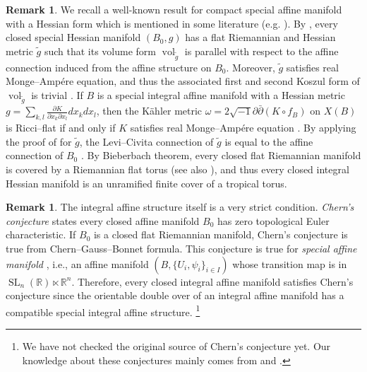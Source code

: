 \documentclass[a4paper,dvipdfmx,reqno,12pt]{amsart}
\makeatletter
\newcommand{\ind}[2]{\emph{#1}\index{1{#2}@{#1}}}
\theoremstyle{definition}
\newtheorem{remark}[theorem]{Remark}
\newcommand{\opn}[1]{\operatorname{#1}}
\newcommand{\myfootnote}[1]{\hspace{-5pt}\footnote{#1}}
\numberwithin{equation}{section}
\makeatother
\begin{document}
\begin{remark} \label{remark-compact-hessian}
We recall a well-known result for 
compact special affine manifold with 
a Hessian form which is mentioned 
in some literature
(e.g. \cite[]{MR1882331}).
By \cite[Theorem 2.1 and Corollary 2.3]{MR714338},
 every closed special Hessian manifold $(B_0,g)$ has 
a flat Riemannian and Hessian metric $\tilde{g}$ such 
that its volume form $\opn{vol}_{\tilde{g}}$ is parallel 
with respect to the
affine connection induced from the affine structure 
on $B_0$. Moreover, $\tilde{g}$ satisfies 
real Monge--Amp\'ere equation, and thus
the associated first and second Koszul 
form of $\opn{vol}_{\tilde{g}}$ is trivial 
\cite[Definition 3.1.2]{MR2293045}.
If $B$ is a special integral affine manifold with 
a Hessian metric 
$g=\sum_{k,l}\frac{\partial K}{\partial x_k \partial x_l}dx_k dx_l$, 
then the K\"ahler metric $\omega=2\sqrt{-1}\partial \bar{\partial}
(K\circ f_{B})$ on $X(B)$ is Ricci--flat if 
and only if $K$ satisfies real Monge--Amp\'ere equation
\cite[Proposition 6.14]{MR2567952}. 
By applying the proof of \cite[Theorem 8.3.3]{MR2293045}
for $\tilde{g}$,
the Levi--Civita connection of $\tilde{g}$ is 
equal to the affine connection of $B_0$ 
\cite[Corollary 8.3.7]{MR2293045}. 
By Bieberbach theorem, every closed flat Riemannian manifold 
is covered by a Riemannian flat torus 
(see also \cite[Theorem 5.3]{MR862114}), and thus every closed 
integral Hessian manifold is an unramified finite cover of 
a tropical torus.
\end{remark}

\begin{remark}
The integral affine structure itself is a very strict condition.
\ind{Chern's conjecture}{Chern's conjecture} states 
every closed affine manifold $B_0$ has zero topological 
Euler characteristic.
If $B_0$ is a closed flat Riemannian manifold, Chern's conjecture is true from Chern--Gauss--Bonnet formula.
This conjecture is true for 
\emph{special affine manifold} \cite{MR3665000},
i.e., an affine manifold $(B, \{U_i,\psi_i\}_{i\in I})$ 
whose transition map is 
in $\opn{SL}_n(\mathbb{R})\ltimes \mathbb{R}^{n}$.
Therefore, every closed integral affine manifold satisfies Chern's conjecture since the orientable double over of an integral affine manifold has a compatible special integral affine structure.
\myfootnote{We have not checked 
the original source of Chern's conjecture yet.
Our knowledge about these conjectures
mainly comes from \cite{goldmanRadianceObstructionParallel1984a}
and \cite{MR3665000}.
}
\end{remark}
\end{document}
